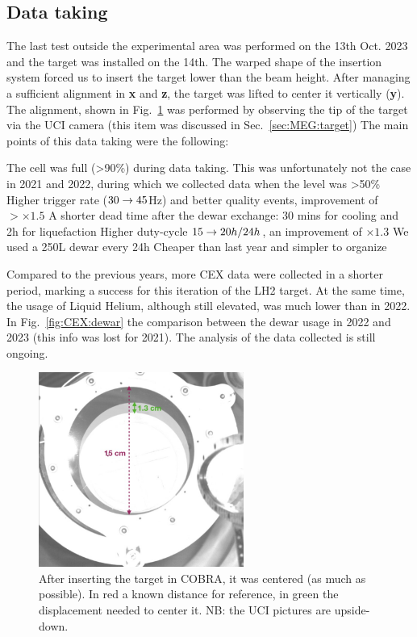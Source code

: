 \begin{refsection}
    \subsection{Data taking}
        The last test outside the experimental area was performed on the 13th Oct. 2023 and the target was installed on the 14th.
        The warped shape of the insertion system forced us to insert the target lower than the beam height. 
        After managing a sufficient alignment in \textbf{x} and \textbf{z}, the target was lifted to center it vertically (\textbf{y}). The alignment, shown in Fig.~\ref{fig:CEX:2023:allignement} was performed by observing the tip of the target via the UCI camera (this item was discussed in Sec.~\ref{sec:MEG:target})
        The main points of this data taking were the following:
        \begin{outline}
            \1 The cell was full (>90\%) during data taking. This was unfortunately not the case in 2021 and 2022, during which we collected data when the level was >50\%
            \2[->] Higher trigger rate ($30\rightarrow45$Hz) and better quality events, improvement of $>\times1.5$
            \1 A shorter dead time after the dewar exchange: 30 mins for cooling and 2h for liquefaction
            \2[->] Higher duty-cycle $15\rightarrow20h/24h$, an improvement of $\times1.3$
            \1 We used a 250L dewar every 24h
            \2[->] Cheaper than last year and simpler to organize
        \end{outline}
        Compared to the previous years, more CEX data were collected in a shorter period, marking a success for this iteration of the LH2 target. 
        At the same time, the usage of Liquid Helium, although still elevated, was much lower than in 2022. In Fig.~\ref{fig:CEX:dewar} the comparison between the dewar usage in 2022 and 2023 (this info was lost for 2021).
        The analysis of the data collected is still ongoing.

        \begin{figure}
            \centering
            \includegraphics[width=0.6\textwidth]{Figures/LH2/2023/LH2_UCI_2023.png}
            \caption[Short Caption]{After inserting the target in COBRA, it was centered (as much as possible). In red a known distance for reference, in green the displacement needed to center it. NB: the UCI pictures are upside-down.}
            \label{fig:CEX:2023:allignement}
        \end{figure}


\end{refsection}

